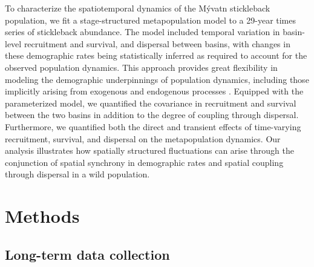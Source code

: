 \documentclass[11pt]{article}
\begin{document}
To characterize the spatiotemporal dynamics of the M\'{y}vatn stickleback population, 
we fit a stage-structured metapopulation model \citep{caswell2001matrix}
to a 29-year times series of stickleback abundance.
The model included temporal variation in basin-level recruitment and survival, 
and dispersal between basins,
with changes in these demographic rates being statistically inferred 
as required to account for the observed population dynamics.
This approach provides great flexibility in modeling the demographic underpinnings of 
population dynamics,
including those implicitly arising from exogenous and endogenous processes
\citep{zeng1998, ives2012}.
Equipped with the parameterized model, 
we quantified the covariance in recruitment and survival between the two basins
in addition to the degree of coupling through dispersal.
Furthermore, we quantified both the direct and transient effects of 
time-varying recruitment, survival, and dispersal
on the metapopulation dynamics.
Our analysis illustrates how spatially structured fluctuations  
can arise through the conjunction of spatial synchrony in demographic rates
and spatial coupling through dispersal in a wild population. 





\section*{Methods} 



\subsection*{Long-term data collection} 
\end{document}
